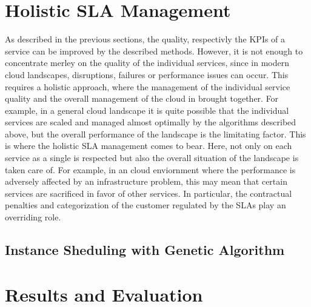
\section{Holistic SLA Management}
As  described in the previous sections, the quality, respectivly the KPIs of a service can be improved by the described methods. However, it is not enough to concentrate merley on the quality of the individual services, since in modern cloud landscapes, disruptions, failures or performance issues can occur. This requires a holistic approach, where the management of the individual service quality and the overall management of the cloud in brought together. For example, in a general cloud landscape it is quite possible that the individual services are scaled and managed almost optimally by the algorithms described above, but the overall performance of the landscape is the limitating factor. This is where the holistic SLA management comes to bear. Here, not only on each service as a single is respected but also the overall situation of the landscape is taken care of. For example, in an cloud enviornment where the performance is adversely affected by an infrastructure problem, this may mean that certain services are sacrificed in favor of other services. In particular, the contractual penalties and categorization of the customer regulated by the SLAs play an overriding role.


\subsection{Instance Sheduling with Genetic Algorithm}

\section{Results and Evaluation}

